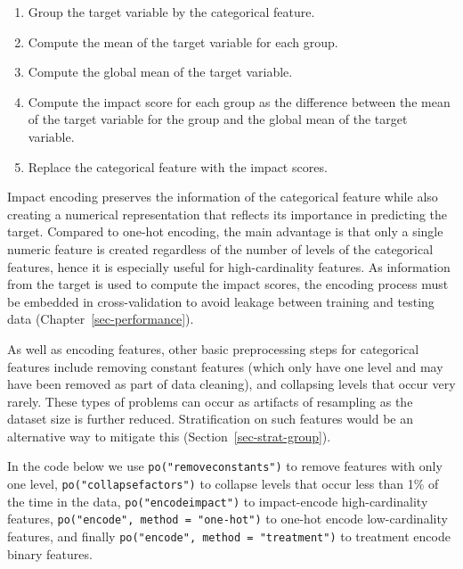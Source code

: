 \begin{enumerate}
\def\labelenumi{\arabic{enumi}.}
\tightlist
\item
  Group the target variable by the categorical feature.
\item
  Compute the mean of the target variable for each group.
\item
  Compute the global mean of the target variable.
\item
  Compute the impact score for each group as the difference between the
  mean of the target variable for the group and the global mean of the
  target variable.
\item
  Replace the categorical feature with the impact scores.
\end{enumerate}

Impact encoding preserves the information of the categorical feature
while also creating a numerical representation that reflects its
importance in predicting the target. Compared to one-hot encoding, the
main advantage is that only a single numeric feature is created
regardless of the number of levels of the categorical features, hence it
is especially useful for high-cardinality features. As information from
the target is used to compute the impact scores, the encoding process
must be embedded in cross-validation to avoid leakage between training
and testing data (Chapter~\ref{sec-performance}).

As well as encoding features, other basic preprocessing steps for
categorical features include removing constant features (which only have
one level and may have been removed as part of data cleaning), and
collapsing levels that occur very rarely. These types of problems can
occur as artifacts of resampling as the dataset size is further reduced.
Stratification on such features would be an alternative way to mitigate
this (Section~\ref{sec-strat-group}).

In the code below we use \texttt{po("removeconstants")} to remove
features with only one level, \texttt{po("collapsefactors")} to collapse
levels that occur less than 1\% of the time in the data,
\texttt{po("encodeimpact")} to impact-encode high-cardinality features,
\texttt{po("encode",\ method\ =\ "one-hot")} to one-hot encode
low-cardinality features, and finally
\texttt{po("encode",\ method\ =\ "treatment")} to treatment encode
binary features.

